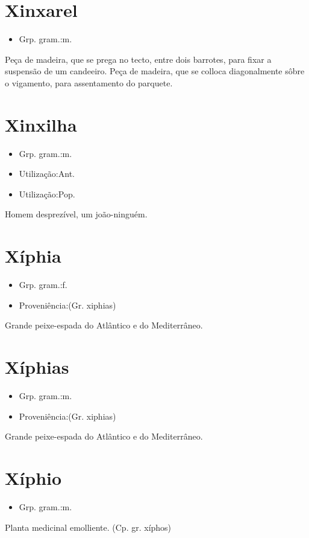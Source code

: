 \section{Xinxarel}
\begin{itemize}
\item {Grp. gram.:m.}
\end{itemize}
Peça de madeira, que se prega no tecto, entre dois barrotes, para fixar a suspensão de um candeeiro.
Peça de madeira, que se colloca diagonalmente sôbre o vigamento, para assentamento do parquete.
\section{Xinxilha}
\begin{itemize}
\item {Grp. gram.:m.}
\end{itemize}
\begin{itemize}
\item {Utilização:Ant.}
\end{itemize}
\begin{itemize}
\item {Utilização:Pop.}
\end{itemize}
Homem desprezível, um joão-ninguém.
\section{Xíphia}
\begin{itemize}
\item {Grp. gram.:f.}
\end{itemize}
\begin{itemize}
\item {Proveniência:(Gr. \textunderscore xiphias\textunderscore )}
\end{itemize}
Grande peixe-espada do Atlântico e do Mediterrâneo.
\section{Xíphias}
\begin{itemize}
\item {Grp. gram.:m.}
\end{itemize}
\begin{itemize}
\item {Proveniência:(Gr. \textunderscore xiphias\textunderscore )}
\end{itemize}
Grande peixe-espada do Atlântico e do Mediterrâneo.
\section{Xíphio}
\begin{itemize}
\item {Grp. gram.:m.}
\end{itemize}
Planta medicinal emolliente.
(Cp. gr. \textunderscore xíphos\textunderscore )
